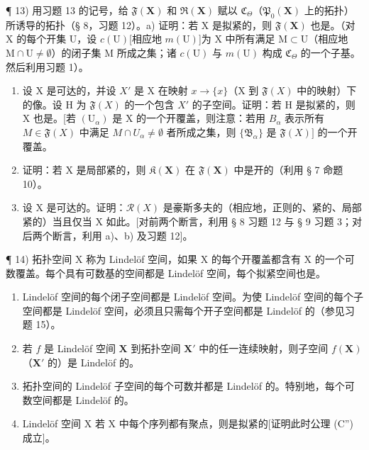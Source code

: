 ¶ 13) 用习题 13 的记号，给 \(\mathfrak{F}(\mathbf{X})\) 和 \(\mathfrak{R}(\mathbf{X})\) 赋以 \(\mathfrak{C}_{\Theta}\)（\(\mathfrak{P}_{0}(\mathbf{X})\) 上的拓扑）所诱导的拓扑（§ 8，习题 12）。a) 证明：若 X 是拟紧的，则 \(\mathfrak{F}(\mathbf{X})\) 也是。（对 X 的每个开集 U，设 \(c(\mathrm{U})\){[}相应地 \(m(\mathrm{U})\){]}为 X 中所有满足 \(\mathrm{M} \subset \mathrm{U}\)（相应地 \(\mathrm{M} \cap \mathrm{U} \neq \emptyset\)）的闭子集 M 所成之集；诸 \(c(\mathrm{U})\) 与 \(m(\mathrm{U})\) 构成 \(\mathfrak{C}_{\Theta}\) 的一个子基。然后利用习题 1）。

\begin{enumerate}
\def\labelenumi{\alph{enumi})}
\setcounter{enumi}{1}
\item
  设 X 是可达的，并设 \(X'\) 是 X 在映射 \(x \to \{x\}\)（X 到 \(\mathfrak{F}(X)\) 中的映射）下的像。设 H 为 \(\mathfrak{F}(X)\) 的一个包含 \(X'\) 的子空间。证明：若 H 是拟紧的，则 X 也是。{[}若 \((\mathrm{U}_{\alpha})\) 是 X 的一个开覆盖，则注意：若用 \(B_{\alpha}\) 表示所有 \(M \in \mathfrak{F}(X)\) 中满足 \(M \cap U_{\alpha} \neq \emptyset\) 者所成之集，则 \(\{\mathfrak{B}_{\alpha}\}\) 是 \(\mathfrak{F}(X)]\) 的一个开覆盖。
\item
  证明：若 X 是局部紧的，则 \(\mathfrak{K}(\mathbf{X})\) 在 \(\mathfrak{F}(\mathbf{X})\) 中是开的（利用 § 7 命题 10）。
\item
  设 X 是可达的。证明：\(\mathcal{R}(X)\) 是豪斯多夫的（相应地，正则的、紧的、局部紧的）当且仅当 X 如此。{[}对前两个断言，利用 § 8 习题 12 与 § 9 习题 3；对后两个断言，利用 a)、b) 及习题 12{]}。
\end{enumerate}

¶ 14) 拓扑空间 X 称为 Lindelöf 空间，如果 X 的每个开覆盖都含有 X 的一个可数覆盖。每个具有可数基的空间都是 Lindelöf 空间，每个拟紧空间也是。

\begin{enumerate}
\def\labelenumi{\alph{enumi})}
\item
  Lindelöf 空间的每个闭子空间都是 Lindelöf 空间。为使 Lindelöf 空间的每个子空间都是 Lindelöf 空间，必须且只需每个开子空间都是 Lindelöf 的（参见习题 15）。
\item
  若 \(f\) 是 Lindelöf 空间 \(\mathbf{X}\) 到拓扑空间 \(\mathbf{X}'\) 中的任一连续映射，则子空间 \(f(\mathbf{X})\)（\(\mathbf{X}'\) 的）是 Lindelöf 的。
\item
  拓扑空间的 Lindelöf 子空间的每个可数并都是 Lindelöf 的。特别地，每个可数空间都是 Lindelöf 的。
\item
  Lindelöf 空间 X 若 X 中每个序列都有聚点，则是拟紧的{[}证明此时公理 (C'') 成立{]}。
\end{enumerate}

